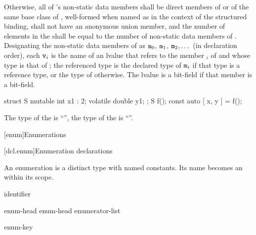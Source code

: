 \pnum
Otherwise,
all of 's non-static data members
shall be direct members of  or
of the same base class of ,
well-formed when named as 
in the context of the structured binding,
 shall not have an anonymous union member, and
the number of elements in the  shall be
equal to the number of non-static data members of .
Designating the non-static data members of  as
$\texttt{m}_0$, $\texttt{m}_1$, $\texttt{m}_2, \dotsc$
(in declaration order),
each $\texttt{v}_i$ is the
name of an lvalue that refers to the member $_i$ of  and
whose type is
that of ;
the referenced type is
the declared type of $\texttt{m}_i$ if that type is a reference type, or
the type of  otherwise.
The lvalue is a
bit-field if that member is a bit-field.
\begin{example}
\begin{codeblock}
struct S { mutable int x1 : 2; volatile double y1; };
S f();
const auto [ x, y ] = f();
\end{codeblock}
The type of the   is ``'',
the type of the   is ``''.
\end{example}

[enum]{Enumerations}%

[dcl.enum]{Enumeration declarations}%
%
%

\pnum
An enumeration is a distinct type with named
constants. Its name becomes an  within its scope.

\begin{bnf}
\br
    identifier
\end{bnf}

\begin{bnf}
\br
    enum-head \terminal{\{}  \terminal{\}}\br
    enum-head \terminal{\{} enumerator-list \terminal{,} \terminal{\}}
\end{bnf}

\begin{bnf}
\br
    enum-key   
\end{bnf}

